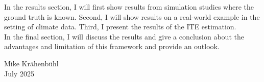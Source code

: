 \documentclass[11pt,a4paper,twoside]{book}
\begin{document}
In the results section, I will first show results from simulation studies where the 
ground truth is known. Second, I will show results on a real-world example in the
setting of climate data. Third, I present the results of the ITE estimation. \\ 

In the final section, I will discuss the results and give a conclusion about the 
advantages and limitation of this framework and provide an outlook.

\bigskip

\begin{flushright}
  Mike Kr{\"a}henb{\"u}hl\\
  July 2025
\end{flushright}


\cleardoublepage
{}




















\cleardoublepage
{}
{}


 








\cleardoublepage
\end{document}
